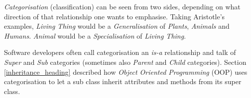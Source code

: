 \emph{Categorisation} (classification) can be seen from two sides, depending on
what direction of that relationship one wants to emphasise. Taking Aristotle's
examples, \emph{Living Thing} would be a \emph{Generalisation} of \emph{Plants},
\emph{Animals} and \emph{Humans}. \emph{Animal} would be a \emph{Specialisation}
of \emph{Living Thing}.

Software developers often call categorisation an \emph{is-a} relationship and
talk of \emph{Super} and \emph{Sub} categories (sometimes also \emph{Parent}
and \emph{Child} categories). Section \ref{inheritance_heading} described how
\emph{Object Oriented Programming} (OOP) uses categorisation to let a sub class
inherit attributes and methods from its super class.
